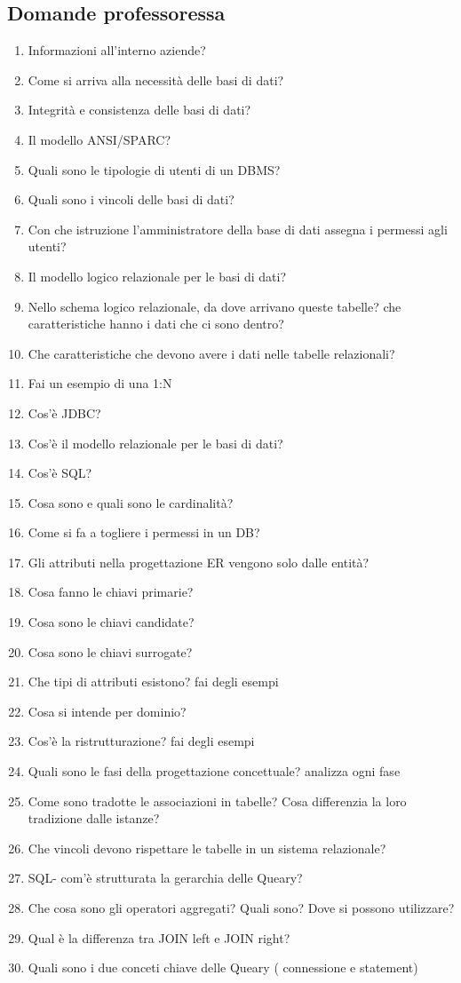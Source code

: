 \documentclass{article}
\begin{document}
\subsection{Domande professoressa}
\begin{enumerate}
    \item Informazioni all'interno aziende? 
    \item Come si arriva alla necessità delle basi di dati?
    \item Integrità e consistenza delle basi di dati?
    \item Il modello ANSI/SPARC?
    \item Quali sono le tipologie di utenti di un DBMS?
    \item Quali sono i vincoli delle basi di dati?
    \item Con che istruzione l'amministratore della base di dati assegna i permessi agli  utenti?
    \item Il modello logico relazionale per le basi di dati?
    \item Nello schema logico relazionale, da dove arrivano queste tabelle? che caratteristiche hanno i dati che ci sono dentro?
    \item Che caratteristiche che devono avere i dati nelle tabelle relazionali?
    \item Fai un esempio di una 1:N
    \item Cos'è JDBC?
    \item Cos'è il modello relazionale per le basi di dati?
    \item Cos'è SQL?
    \item Cosa sono e quali sono le cardinalità?
    \item Come si fa a togliere i permessi in un DB?
    \item Gli attributi nella progettazione ER vengono solo dalle entità? 
    \item Cosa fanno le chiavi primarie?
    \item Cosa sono le chiavi candidate?
    \item Cosa sono le chiavi surrogate?
    \item Che tipi di attributi esistono? fai degli esempi
    \item Cosa si intende per dominio?
    \item Cos'è la ristrutturazione? fai degli esempi
    \item Quali sono le fasi della progettazione concettuale? analizza ogni fase
    \item Come sono tradotte le associazioni in tabelle? Cosa differenzia la loro tradizione dalle istanze?
    \item Che vincoli devono rispettare le tabelle in un sistema relazionale?
    \item SQL- com'è strutturata la gerarchia delle Queary?
    \item Che cosa sono gli operatori aggregati? Quali sono? Dove si possono utilizzare?
    \item Qual è la differenza tra JOIN left e JOIN right?
    \item Quali sono i due conceti chiave delle Queary ( connessione e statement) 
    

\end{enumerate}
\end{document}
